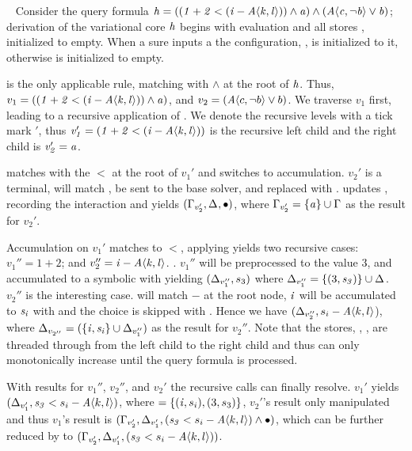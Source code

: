 ~\label{section:vsmt:example}
%
Consider the query formula $\kf{h = ((1 + 2 < (i - \chc[A]{k,l})) \wedge a)
  \wedge (\chc[A]{c,\neg b} \vee b)}$; derivation of the variational core
$\mathit{h}$ begins with evaluation and all stores \aStore{}, \eStore{} initialized
to empty. When a sure inputs a \vc{} the configuration, \configuration{}, is
initialized to it, otherwise \configuration{} is initialized to empty.

 is the only applicable rule, matching \boolFuncs{} with $\wedge$
at the root of $\mathit{h}$. Thus, $v_{1} = \kf{((1 + 2 < (i -
  \chc[A]{k,l})) \wedge a)}$, and $v_{2} = (\chc[A]{c,\neg b} \vee b)$. We
traverse $v_{1}$ first, leading to a recursive application of .
We denote the recursive levels with a tick mark $'$, thus \newline{} $\kf{v_{1}' = (1 + 2 <
  (i - \chc[A]{k,l}))}$ is the recursive left child and the right child is
$\mathit{v_{2}' = a}$.

 matches \inequalities{}with the $<$ at the root of $v_{1}'$ and
switches to accumulation. $v_{2}'$ is a terminal, will match , be
sent to the base solver, and replaced with \unit{}.  updates
\eStore{}, recording the interaction and yields $(\Gamma_{v_{2}'},\Delta_{},
\bullet{}{})$, where $\Gamma_{v_{2}'} = \{\mathit{a}\} \cup \Gamma_{}$ as the result for
$v_{2}'$.

Accumulation on $v_{1}'$ matches \inequalities{} to $<$, applying
 yields two recursive cases: $v_{1}'' = 1 + 2$; and $v_{2}'' =
\kf{i - \chc[A]{k,l}}$. .
%
$v_{1}''$ will be preprocessed to the value 3, and accumulated to a symbolic with
 yielding $(\Delta_{v_{1}''}, s_{3})$ where $\Delta_{v_{1}''} =
\{(3, \mathit{s_{3}})\} \cup \Delta_{}$. $v_{2}''$ is the interesting case.
 will match $-$ at the root node, $\mathit{i}$ will be accumulated
to $\mathit{s_{i}}$ with  and the choice is skipped with
. Hence we have $(\aStore{v_{2}''}, s_{i} - \chc[A]{k,l}$), where
$\Delta_{v_{2''}} = (\{\mathit{i, s_{i}}\} \cup \Delta_{v_{1}''})$ as the result for
$v_{2}''$. Note that the stores, \aStore{}, \eStore{}, are threaded through from the left
child to the right child and thus can only monotonically increase until the
query formula is processed.

With results for $v_{1}''$, $v_{2}''$, and $v_{2}'$ the recursive calls can finally
resolve. $v_{1}'$ yields $(\aStore{v_{1}'}, \kf{s_{3}} < s_{i} - \chc[A]{k,l})$,
where  $= \{(\mathit{i}, s_{i}), (3, s_{3})\}$, $v_{2}'$'s result
only manipulated \eStore{} and thus $v_{1}$'s result is $(\eStore{v_{2}'},
\aStore{v_{1}'}, (\kf{s_{3}} < s_{i} - \chc[A]{k,l}) \wedge \unit{})$, which can
be further reduced by  to \newline{} $(\eStore{v_{2}'},
\aStore{v_{1}'}, (\kf{s_{3}} < s_{i} - \chc[A]{k,l}))$.

